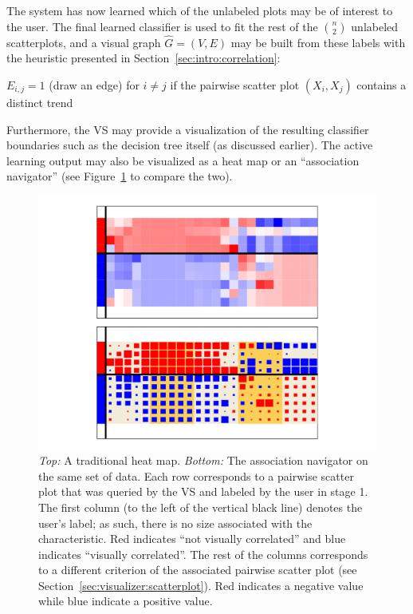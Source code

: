 The system has now learned which of the unlabeled plots 
may be of interest to the user. The final learned classifier is used to fit the 
rest of the $n \choose 2$ unlabeled scatterplots, and a visual graph 
$\hat{G}=(V,E)$ 
may be built from these labels with the heuristic presented in 
Section~\ref{sec:intro:correlation}:

\begin{algorithm}
	$E_{i,j} = 1$ (draw an edge) for $i\neq j$ if the pairwise scatter plot 
	$(X_i,X_j)$ contains a distinct trend
\end{algorithm}

Furthermore, the VS may provide a visualization of the resulting classifier 
boundaries such as the decision tree itself (as discussed earlier). The active 
learning output may also be visualized as a heat map or an ``association 
navigator'' (see 
Figure~\ref{fig:visualizer:heatmap} to compare the two). 

\tablespacing
\begin{figure}[H]
	\begin{center}
		\includegraphics[width=1\linewidth]{ch-visualizer/figures/heatmap}
		\caption[Heat map versus association navigator]{\textit{Top:} A 
		traditional heat map. \textit{Bottom:} The association navigator on the 
		same set of data. 
		Each row corresponds to a pairwise scatter plot that was queried by the 
		VS and labeled by the user in 
		stage 1. The first column (to the left of the vertical black line) 
		denotes the user's label; as such, there is no size associated with the 
		characteristic. Red indicates ``not visually correlated'' 
		and blue indicates ``visually correlated''. The rest of the columns 
		corresponds to a different criterion of the associated pairwise 
		scatter plot (see Section~\ref{sec:visualizer:scatterplot}). Red 
		indicates a negative value while blue indicate a positive value. 		
		}
		\label{fig:visualizer:heatmap}
	\end{center}
\end{figure}
\bodyspacing

